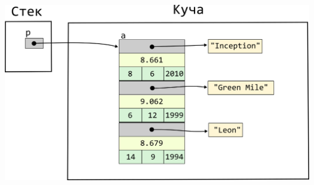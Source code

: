 \documentclass{article}
\begin{document}
\begin{center}
\includegraphics[scale=1]{../../images/pointer_schemes/pointer_to_array_of_struct_movie_charpointers_segments.png}
\end{center}

\newpage
\end{document}
